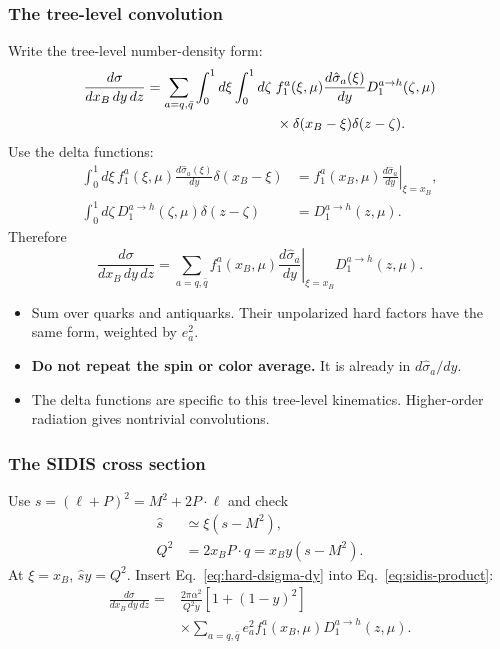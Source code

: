 \documentclass[14pt,a4paper]{extarticle}
\numberwithin{equation}{section}
\begin{document}
\subsubsection{The tree-level convolution}
Write the tree-level number-density form:
\begin{align}
 \frac{d\sigma}{dx_B\,dy\,dz}
 =\sum_{a=q,\bar q}\int_0^1d\xi\int_0^1d\zeta\;&
 f_1^a(\xi,\mu)\frac{d\hat\sigma_a(\xi)}{dy}
 D_1^{a\to h}(\zeta,\mu)\notag\\
 &\times\delta(x_B-\xi)\delta(z-\zeta).
 \label{eq:sidis-lo-convolution}
\end{align}
Use the delta functions:
\begin{align}
 \int_0^1d\xi\,f_1^a(\xi,\mu)
 \frac{d\hat\sigma_a(\xi)}{dy}\delta(x_B-\xi)
 &=f_1^a(x_B,\mu)
 \left.\frac{d\hat\sigma_a}{dy}\right|_{\xi=x_B},\\
 \int_0^1d\zeta\,D_1^{a\to h}(\zeta,\mu)\delta(z-\zeta)
 &=D_1^{a\to h}(z,\mu).
\end{align}
Therefore
\begin{equation}
 \boxed{\frac{d\sigma}{dx_B\,dy\,dz}
 =\sum_{a=q,\bar q}f_1^a(x_B,\mu)
 \left.\frac{d\hat\sigma_a}{dy}\right|_{\xi=x_B}
 D_1^{a\to h}(z,\mu).}
 \label{eq:sidis-product}
\end{equation}
\begin{itemize}
 \item Sum over quarks and antiquarks. Their unpolarized hard factors
 have the same form, weighted by $e_a^2$.
 \item \textbf{Do not repeat the spin or color average.}
 It is already in $d\hat\sigma_a/dy$.
 \item The delta functions are specific to this tree-level kinematics.
 Higher-order radiation gives nontrivial convolutions.
\end{itemize}

\subsubsection{The SIDIS cross section}
Use $s=(\ell+P)^2=M^2+2P\cdot\ell$ and check
\begin{align}
 \hat s&\simeq\xi(s-M^2),\\
 Q^2&=2x_BP\cdot q=x_By(s-M^2).
 \label{eq:sidis-Q2-xy}
\end{align}
At $\xi=x_B$, $\hat s y=Q^2$. Insert
Eq.~\eqref{eq:hard-dsigma-dy} into Eq.~\eqref{eq:sidis-product}:
\begin{equation}
 \boxed{\begin{aligned}
 \frac{d\sigma}{dx_B\,dy\,dz}
 ={}&\frac{2\pi\alpha^2}{Q^2y}[1+(1-y)^2]\\
 &\times\sum_{a=q,\bar q}e_a^2
 f_1^a(x_B,\mu)D_1^{a\to h}(z,\mu).
 \end{aligned}}
 \label{eq:sidis-final-lo}
\end{equation}
\end{document}
